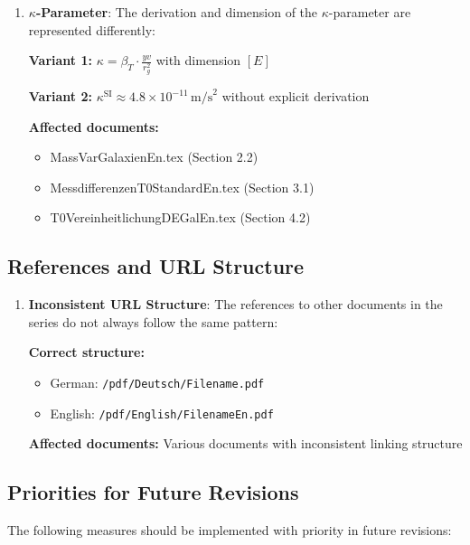 \documentclass[12pt,a4paper]{article}
\begin{document}
	\begin{enumerate}[label=\textbf{P\arabic*.},resume]
		\item \textbf{$\kappa$-Parameter}: The derivation and dimension of the $\kappa$-parameter are represented differently:
		
		\textbf{Variant 1:} $\kappa = \beta_T \cdot \frac{yv}{r_g^2}$ with dimension $[E]$
		
		\textbf{Variant 2:} $\kappa^{\text{SI}} \approx 4.8 \times 10^{-11} \, \text{m/s}^2$ without explicit derivation
		
		\textbf{Affected documents:}
		\begin{itemize}
			\item MassVarGalaxienEn.tex (Section 2.2)
			\item MessdifferenzenT0StandardEn.tex (Section 3.1)
			\item T0VereinheitlichungDEGalEn.tex (Section 4.2)
		\end{itemize}
	\end{enumerate}
	
	\subsection{References and URL Structure}
	
	\begin{enumerate}[label=\textbf{P\arabic*.},resume]
		\item \textbf{Inconsistent URL Structure}: The references to other documents in the series do not always follow the same pattern:
		
		\textbf{Correct structure:}
		\begin{itemize}
			\item German: \texttt{/pdf/Deutsch/Filename.pdf}
			\item English: \texttt{/pdf/English/FilenameEn.pdf}
		\end{itemize}
		
		\textbf{Affected documents:} Various documents with inconsistent linking structure
	\end{enumerate}
	
	\subsection{Priorities for Future Revisions}
	
	The following measures should be implemented with priority in future revisions:
	
\end{document}
